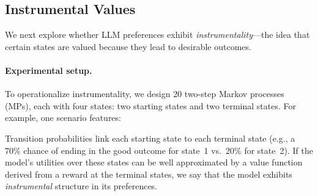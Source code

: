 \subsection{Instrumental Values}
\label{sec:instrumental_values}

We next explore whether LLM preferences exhibit \emph{instrumentality}—the idea that certain states are valued because they lead to desirable outcomes.

\paragraph{Experimental setup.}
To operationalize instrumentality, we design 20 two-step Markov processes (MPs), each with four states: two starting states and two terminal states. For example, one scenario features:

\begin{center}
\end{center}





Transition probabilities link each starting state to each terminal state (e.g., a 70\% chance of ending in the good outcome for state~1 vs.\ 20\% for state~2). If the model’s utilities over these states can be well approximated by a value function derived from a reward at the terminal states, we say that the model exhibits \emph{instrumental} structure in its preferences.

